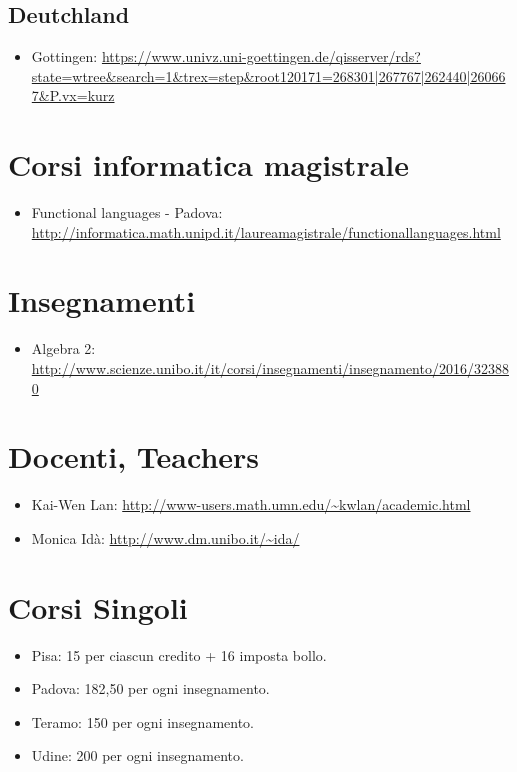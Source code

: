 \documentclass[a4paper,10pt]{article}
\begin{document}
\subsection{Deutchland}
\begin{itemize}
 \item Gottingen: \url{https://www.univz.uni-goettingen.de/qisserver/rds?state=wtree&search=1&trex=step&root120171=268301|267767|262440|260667&P.vx=kurz}
\end{itemize}


\section{Corsi informatica magistrale}
\begin{itemize}
 \item Functional languages - Padova: \url{http://informatica.math.unipd.it/laureamagistrale/functionallanguages.html}
\end{itemize}


\section{Insegnamenti}
\begin{itemize}
 \item Algebra 2: \url{http://www.scienze.unibo.it/it/corsi/insegnamenti/insegnamento/2016/323880}
\end{itemize}

\section{Docenti, Teachers}
\begin{itemize}
 \item Kai-Wen Lan: \url{http://www-users.math.umn.edu/~kwlan/academic.html}
 \item Monica Idà: \url{http://www.dm.unibo.it/~ida/}
\end{itemize}


\section{Corsi Singoli}
\begin{itemize}
 \item Pisa: 15 per ciascun credito + 16 imposta bollo.
 \item Padova: 182,50 per ogni insegnamento.
 \item Teramo: 150 per ogni insegnamento.
 \item Udine: 200 per ogni insegnamento. 
\end{itemize}
\end{document}
